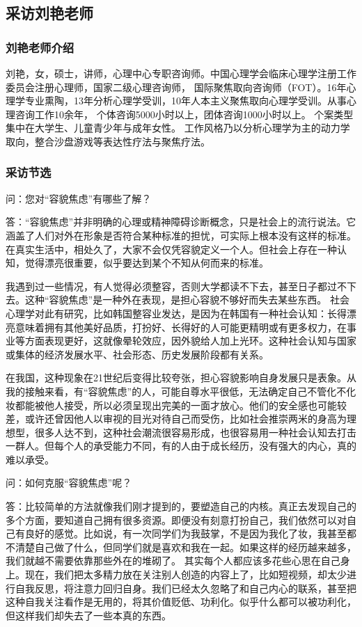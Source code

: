 \subsection{采访刘艳老师}
\subsubsection{刘艳老师介绍}
刘艳，女，硕士，讲师，心理中心专职咨询师。中国心理学会临床心理学注册工作委员会注册心理师，国家二级心理咨询师，
国际聚焦取向咨询师（FOT）。16年心理学专业熏陶，13年分析心理学受训，10年人本主义聚焦取向心理学受训。从事心理咨询工作10余年，
个体咨询5000小时以上，团体咨询1000小时以上。
个案类型集中在大学生、儿童青少年与成年女性。
工作风格乃以分析心理学为主的动力学取向，整合沙盘游戏等表达性疗法与聚焦疗法。
\subsubsection{采访节选}
问：您对``容貌焦虑''有哪些了解？

答：``容貌焦虑''并非明确的心理或精神障碍诊断概念，只是社会上的流行说法。它涵盖了人们对外在形象是否符合某种标准的担忧，可实际上根本没有这样的标准。在真实生活中，相处久了，大家不会仅凭容貌定义一个人。但社会上存在一种认知，觉得漂亮很重要，似乎要达到某个不知从何而来的标准。

我遇到过一些情况，有人觉得必须整容，否则大学都读不下去，甚至日子都过不下去。这种``容貌焦虑''是一种外在表现，是担心容貌不够好而失去某些东西。
社会心理学对此有研究，比如韩国整容业发达，是因为在韩国有一种社会认知：长得漂亮意味着拥有其他美好品质，打扮好、长得好的人可能更精明或有更多权力，在事业等方面表现更好，这就像晕轮效应，因外貌给人加上光环。这种社会认知与国家或集体的经济发展水平、社会形态、历史发展阶段都有关系。

在我国，这种现象在21世纪后变得比较夸张，担心容貌影响自身发展只是表象。从我的接触来看，有``容貌焦虑''的人，可能自尊水平很低，无法确定自己不管化不化妆都能被他人接受，所以必须呈现出完美的一面才放心。他们的安全感也可能较差，或许还曾因他人以审视的目光对待自己而受伤，比如社会推崇两米的身高为理想型，很多人达不到，这种社会潮流很容易形成，也很容易用一种社会认知去打击一群人。但每个人的承受能力不同，有的人由于成长经历，没有强大的内心，真的难以承受。

问：如何克服``容貌焦虑''呢？

答：比较简单的方法就像我们刚才提到的，要塑造自己的内核。真正去发现自己的多个方面，要知道自己拥有很多资源。即便没有刻意打扮自己，我们依然可以对自己有良好的感觉。比如说，有一次同学们为我鼓掌，不是因为我化了妆，我甚至都不清楚自己做了什么，但同学们就是喜欢和我在一起。如果这样的经历越来越多，我们就越不需要依靠那些外在的堆砌了。
其实每个人都应该多花些心思在自己身上。现在，我们把太多精力放在关注别人创造的内容上了，比如短视频，却太少进行自我反思，将注意力回归自身。我们已经太久忽略了和自己内心的联系，甚至把这种自我关注看作是无用的，将其价值贬低、功利化。似乎什么都可以被功利化，但这样我们却失去了一些本真的东西。

